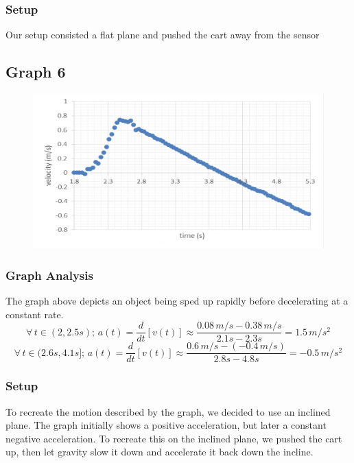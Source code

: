 \documentclass[11pt, letterpaper, includehead]{article}
\begin{document}
  \subsubsection{Setup}
  Our setup consisted a flat plane and pushed the cart away from the sensor


  \subsection{Graph 6}

  \begin{figure}[H] %
    \centering 
    \includegraphics[width=\linewidth]{graph_6.png}
  \end{figure}

  \subsubsection{Graph Analysis}
  The graph above depicts an object being sped up rapidly before decelerating
  at a constant rate.
  $$\forall \, t \in (2, 2.5s); \, a(t) = \frac{d}{dt}[v(t)] \approx \frac{0.08 \, m/s - 0.38 \, m/s}{2.1s - 2.3s} = 1.5 \, m/s^2$$
  $$\forall \, t \in (2.6s, 4.1s]; \, a(t) = \frac{d}{dt}[v(t)] \approx \frac{0.6 \, m/s -(-0.4 \, m/s)}{2.8s - 4.8s} = -0.5 \, m/s^2$$ 
  \subsubsection{Setup}
  To recreate the motion described by the graph, we decided to use an inclined plane.
  The graph initially shows a positive acceleration, but later a constant negative acceleration.
  To recreate this on the inclined plane, we pushed the cart up, then let
  gravity slow it down and accelerate it back down the incline.
\end{document}
